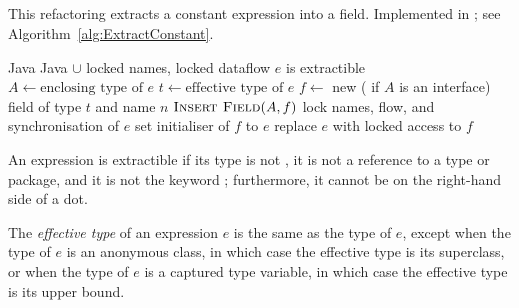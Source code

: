\subsection{}
This refactoring extracts a constant expression into a field. Implemented in ; see Algorithm~\ref{alg:ExtractConstant}.

\begin{algorithm}[p]
\caption{$\refactoring{Extract Constant}(e : \type{Expr}, n : \type{Name})$}\label{alg:ExtractConstant}
\begin{algorithmic}[1]
\REQUIRE Java
\ENSURE Java $\cup$ locked names, locked dataflow
\medskip
\STATE \assert $e$ is extractible
\STATE $A \leftarrow \text{enclosing type of $e$}$
\STATE $t \leftarrow \text{effective type of $e$}$
\STATE $f \leftarrow$ new  ( if $A$ is an interface)  field of type $t$ and name $n$
\STATE $\textsc{Insert Field}(A, f)$
\STATE lock names, flow, and synchronisation of $e$
\STATE set initialiser of $f$ to $e$
\STATE replace $e$ with locked access to $f$
\end{algorithmic}
\end{algorithm}

An expression is extractible if its type is not , it is not a reference to a type or package, and it is not the keyword ; furthermore, it cannot be on the right-hand side of a dot.

The \emph{effective type} of an expression $e$ is the same as the type of $e$, except when the type of $e$ is an anonymous class, in which case the effective type is its superclass, or when the type of $e$ is a captured type variable, in which case the effective type is its upper bound.
